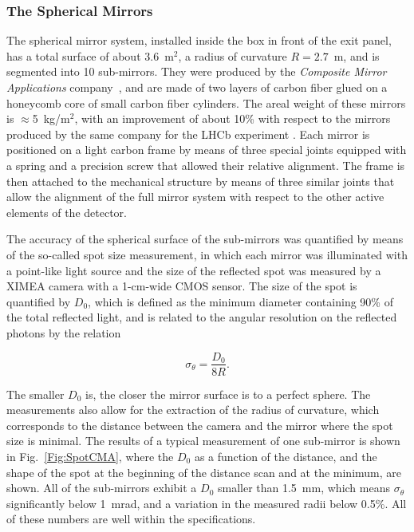 \documentclass[5p,times,twocolumn]{elsarticle}
\begin{document}
\subsubsection{The Spherical Mirrors}

The spherical mirror system, installed inside the box in front of the exit panel, has a total surface of about 3.6~m$^2$,
a radius of curvature $R= 2.7$~m, and is segmented into 10 sub-mirrors. They were produced by the {\it Composite
Mirror Applications} company~\cite{REF:CMA}, and are made of two layers of carbon fiber glued on a honeycomb
core of small carbon fiber cylinders. The areal weight of these mirrors is $\approx$5~kg/m$^2$, with an
improvement of about 10\% with respect to the mirrors produced by the same company for the LHCb experiment
\cite{REF:LHCbMirrors}. Each mirror is positioned on a light carbon frame by means of three special joints equipped
with a spring and a precision screw that allowed their relative alignment. The frame is then attached to the mechanical
structure by means of three similar joints that allow the alignment of the full mirror system with respect to the other
active elements of the detector.

The accuracy of the spherical surface of the sub-mirrors was quantified by means of the so-called spot size
measurement, in which each mirror was illuminated with a point-like light source and the size of the reflected spot
was measured by a XIMEA camera with a 1-cm-wide CMOS sensor. The size of the spot is quantified by $D_0$, which
is defined as the minimum diameter containing 90\% of the total reflected light, and is related to the angular resolution
on the reflected photons by the relation

\begin{equation}
  \sigma_{\theta} = \frac{D_0}{8 R}.
\end{equation}

The smaller $D_0$ is, the closer the mirror surface is to a perfect sphere. The measurements also allow for the
extraction of the radius of curvature, which corresponds to the distance between the camera and the mirror where
the spot size is minimal. The results of a typical measurement of one sub-mirror is shown in Fig.~\ref{Fig:SpotCMA},
where the $D_0$ as a function of the distance, and the shape of the spot at the beginning of the distance scan and
at the minimum, are shown. All of the sub-mirrors exhibit a $D_0$ smaller than 1.5~mm, which means $\sigma_{\theta}$
significantly below 1~mrad, and a variation in the measured radii below 0.5\%. All of these numbers are well within the
specifications.
\end{document}
